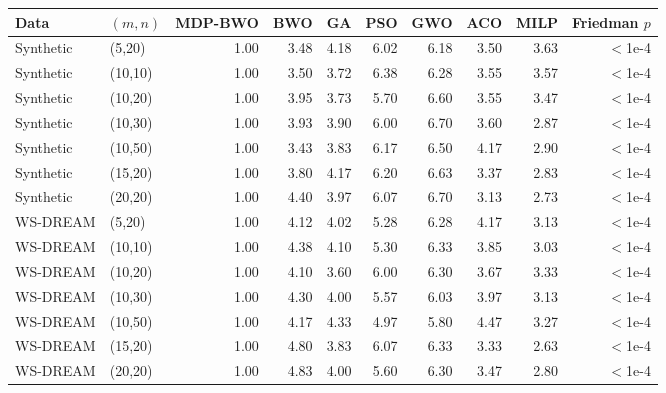 \begin{tabular}{llrrrrrrrr}\toprule
Data & $(m,n)$ & MDP-BWO & BWO & GA & PSO & GWO & ACO & MILP & Friedman $p$\\\midrule
Synthetic & (5,20) & 1.00 & 3.48 & 4.18 & 6.02 & 6.18 & 3.50 & 3.63 & $<$1e-4\\
Synthetic & (10,10) & 1.00 & 3.50 & 3.72 & 6.38 & 6.28 & 3.55 & 3.57 & $<$1e-4\\
Synthetic & (10,20) & 1.00 & 3.95 & 3.73 & 5.70 & 6.60 & 3.55 & 3.47 & $<$1e-4\\
Synthetic & (10,30) & 1.00 & 3.93 & 3.90 & 6.00 & 6.70 & 3.60 & 2.87 & $<$1e-4\\
Synthetic & (10,50) & 1.00 & 3.43 & 3.83 & 6.17 & 6.50 & 4.17 & 2.90 & $<$1e-4\\
Synthetic & (15,20) & 1.00 & 3.80 & 4.17 & 6.20 & 6.63 & 3.37 & 2.83 & $<$1e-4\\
Synthetic & (20,20) & 1.00 & 4.40 & 3.97 & 6.07 & 6.70 & 3.13 & 2.73 & $<$1e-4\\
WS-DREAM & (5,20) & 1.00 & 4.12 & 4.02 & 5.28 & 6.28 & 4.17 & 3.13 & $<$1e-4\\
WS-DREAM & (10,10) & 1.00 & 4.38 & 4.10 & 5.30 & 6.33 & 3.85 & 3.03 & $<$1e-4\\
WS-DREAM & (10,20) & 1.00 & 4.10 & 3.60 & 6.00 & 6.30 & 3.67 & 3.33 & $<$1e-4\\
WS-DREAM & (10,30) & 1.00 & 4.30 & 4.00 & 5.57 & 6.03 & 3.97 & 3.13 & $<$1e-4\\
WS-DREAM & (10,50) & 1.00 & 4.17 & 4.33 & 4.97 & 5.80 & 4.47 & 3.27 & $<$1e-4\\
WS-DREAM & (15,20) & 1.00 & 4.80 & 3.83 & 6.07 & 6.33 & 3.33 & 2.63 & $<$1e-4\\
WS-DREAM & (20,20) & 1.00 & 4.83 & 4.00 & 5.60 & 6.30 & 3.47 & 2.80 & $<$1e-4\\
\bottomrule
\end{tabular}